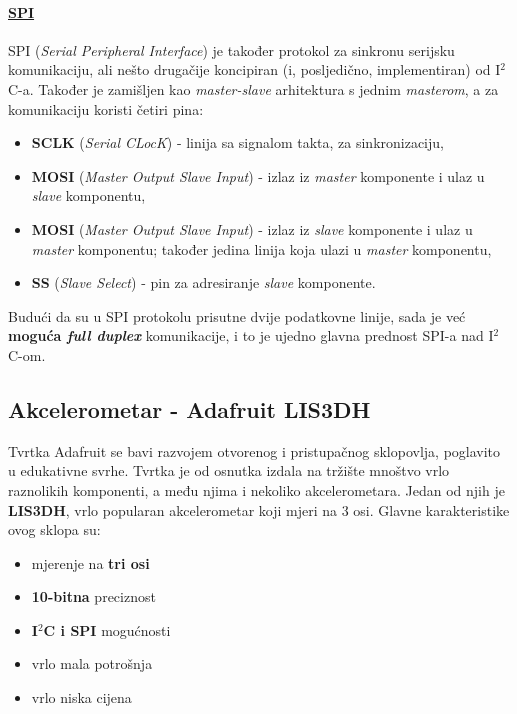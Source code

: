 \documentclass[12pt,a4paper]{article}
\begin{document}
	\paragraph{\underline{SPI}} %
	\label{par:spi}
		SPI (\textit{Serial Peripheral Interface}) je također protokol za sinkronu serijsku komunikaciju, ali nešto drugačije koncipiran (i, posljedično, implementiran) od I$^2$C-a. Također je zamišljen kao \textit{master-slave} arhitektura s jednim \textit{masterom}, a za komunikaciju koristi četiri pina:
		\begin{itemize}
			\item \textbf{SCLK} (\textit{Serial CLocK}) - linija sa signalom takta, za sinkronizaciju,
			\item \textbf{MOSI} (\textit{Master Output Slave Input}) - izlaz iz \textit{master} komponente i ulaz u \textit{slave} komponentu,
			\item \textbf{MOSI} (\textit{Master Output Slave Input}) - izlaz iz \textit{slave} komponente i ulaz u \textit{master} komponentu; također jedina linija koja ulazi u \textit{master} komponentu,
			\item \textbf{SS} (\textit{Slave Select}) - pin za adresiranje \textit{slave} komponente.
		\end{itemize}

		Budući da su u SPI protokolu prisutne dvije podatkovne linije, sada je već \textbf{moguća \textit{full duplex}} komunikacije, i to je ujedno glavna prednost SPI-a nad I$^2$C-om.

	\newpage
	\subsection{Akcelerometar - Adafruit LIS3DH}
		Tvrtka Adafruit se bavi razvojem otvorenog i pristupačnog sklopovlja, poglavito u edukativne svrhe. Tvrtka je od osnutka izdala na tržište mnoštvo vrlo raznolikih komponenti, a među njima i nekoliko akcelerometara. Jedan od njih je \textbf{LIS3DH}, vrlo popularan akcelerometar koji mjeri na 3 osi. Glavne karakteristike ovog sklopa su:
		\begin{itemize}
			\item mjerenje na \textbf{tri osi}
			\item \textbf{10-bitna} preciznost
			\item \textbf{I$^2$C i SPI} mogućnosti
			\item vrlo mala potrošnja
			\item vrlo niska cijena
		\end{itemize}
\end{document}
